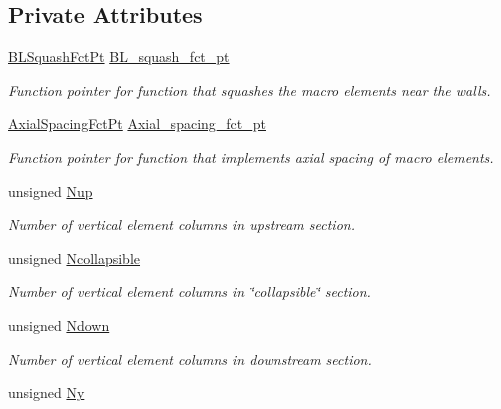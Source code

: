 \subsection*{Private Attributes}
\begin{DoxyCompactItemize}
\item 
\hyperlink{classoomph_1_1CollapsibleChannelDomain_a2bf1d7943bfac134a5c27a54c7e1faed}{B\+L\+Squash\+Fct\+Pt} \hyperlink{classoomph_1_1CollapsibleChannelDomain_a3d3f5d77c3221da20cd02bf02be800b7}{B\+L\+\_\+squash\+\_\+fct\+\_\+pt}
\begin{DoxyCompactList}\small\item\em Function pointer for function that squashes the macro elements near the walls. \end{DoxyCompactList}\item 
\hyperlink{classoomph_1_1CollapsibleChannelDomain_a317472dab112beac771ecf6442a465f5}{Axial\+Spacing\+Fct\+Pt} \hyperlink{classoomph_1_1CollapsibleChannelDomain_a6f4c3319be685553715f5cd776eea0fc}{Axial\+\_\+spacing\+\_\+fct\+\_\+pt}
\begin{DoxyCompactList}\small\item\em Function pointer for function that implements axial spacing of macro elements. \end{DoxyCompactList}\item 
unsigned \hyperlink{classoomph_1_1CollapsibleChannelDomain_a16bef61c4223f92cb1b0c35e9a7ea7d2}{Nup}
\begin{DoxyCompactList}\small\item\em Number of vertical element columns in upstream section. \end{DoxyCompactList}\item 
unsigned \hyperlink{classoomph_1_1CollapsibleChannelDomain_a607c389c3f0c06f0240d97aaca65cdf7}{Ncollapsible}
\begin{DoxyCompactList}\small\item\em Number of vertical element columns in \char`\"{}collapsible\char`\"{} section. \end{DoxyCompactList}\item 
unsigned \hyperlink{classoomph_1_1CollapsibleChannelDomain_a1f9c92507803d56e12cf5cb24b11cd83}{Ndown}
\begin{DoxyCompactList}\small\item\em Number of vertical element columns in downstream section. \end{DoxyCompactList}\item 
unsigned \hyperlink{classoomph_1_1CollapsibleChannelDomain_a13c992ef93891493c5da50afff67d38c}{Ny}

\end{DoxyCompactItemize}
